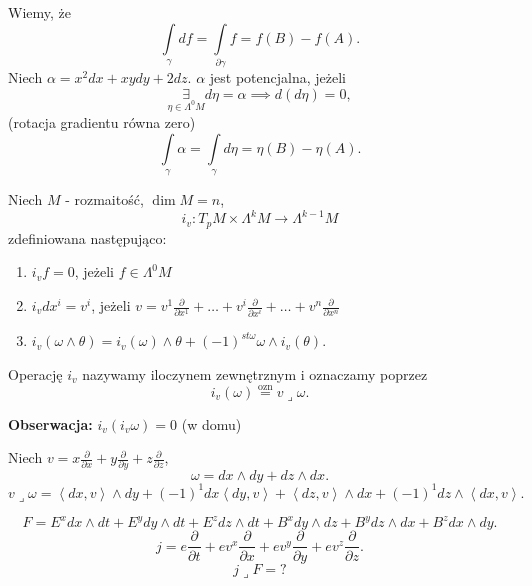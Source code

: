 \documentclass[../main.tex]{subfiles}
\begin{document}
Wiemy, że
\[
    \int\limits_{\gamma}df = \int\limits_{\partial\gamma}f = f(B) - f(A)
.\]
Niech $\alpha = x^2dx + xydy + 2dz$. $\alpha$ jest potencjalna, jeżeli
\[
    \underset{\eta\in \Lambda^0M}{\exists} d\eta = \alpha \implies d(d\eta) = 0
,\]
(rotacja gradientu równa zero)
\[
    \int\limits_{\gamma}\alpha = \int\limits_{\gamma}d\eta = \eta(B) - \eta(A)
.\]

\pagebreak
\begin{definicja}
    Niech $M$ - rozmaitość, $\dim M = n$,\\
    \[
        i_v : T_pM \times \Lambda^kM\to \Lambda^{k-1}M
    \]
    zdefiniowana następująco:
    \begin{enumerate}
        \item $i_v f = 0$, jeżeli $f\in \Lambda^0M$
        \item  $i_v dx^i = v^i$, jeżeli $v = v^1 \frac{\partial }{\partial x^1} + \ldots + v^i \frac{\partial }{\partial x^i} + \ldots + v^n \frac{\partial }{\partial x^n} $
        \item $i_v(\omega\land \theta) = i_v(\omega)\land \theta + (-1)^{st \omega} \omega\land i_v(\theta)$.
    \end{enumerate}
    Operację $i_v$ nazywamy iloczynem zewnętrznym i oznaczamy poprzez
    \[
        i_v(\omega) \overset{\text{ozn}}{=} v \lrcorner \omega
    .\]
\end{definicja}
\textbf{Obserwacja:} $i_v(i_v\omega) = 0 $ (w domu)
\begin{przyklad}
    Niech $v = x \frac{\partial }{\partial x} + y \frac{\partial }{\partial y} + z \frac{\partial }{\partial z} $,
    \[
    \omega = dx\land dy + dz \land dx
    .\]
\[
    v \lrcorner \omega = \left<dx, v \right> \land dy + (-1)^1 dx\left<dy,v \right> + \left<dz, v \right>\land dx + (-1)^1 dz\land \left<dx, v \right>
.\]
\end{przyklad}
\begin{przyklad}
    \[
     F = E^xdx\land dt + E^ydy\land dt + E^z dz\land dt + B^x dy\land dz + B^ydz\land dx + B^zdx\land dy
    .\]
\[
j = e \frac{\partial }{\partial t} + ev^x \frac{\partial }{\partial x}  + ev^y \frac{\partial }{\partial y} + ev^z \frac{\partial }{\partial z}
.\]
\[
    j \lrcorner  F = ?
\]
\end{przyklad}
\end{document}

